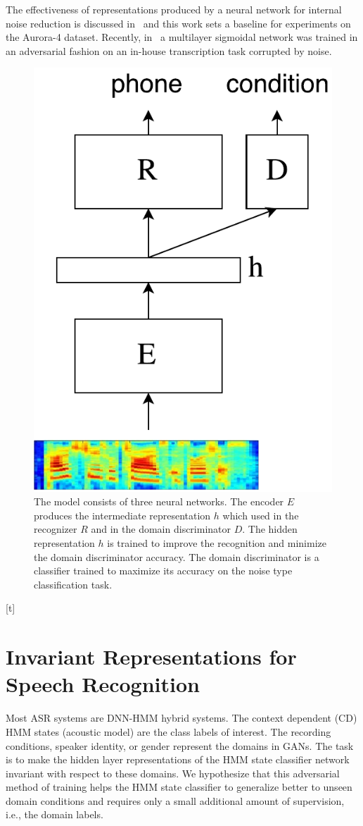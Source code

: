 \documentclass[a4paper]{article}
\begin{document}
    The effectiveness of representations produced by a neural network for internal 
    noise reduction is discussed in~\cite{yu2013feature} and this work sets a 
    baseline for experiments on the Aurora-4 dataset. Recently, 
    in~\cite{yusuke2016adversarial} a multilayer sigmoidal network was trained 
    in an adversarial fashion on an in-house transcription task corrupted by noise.
\begin{figure}[t]
    \centering
    \includegraphics[width=0.4\linewidth]{model.pdf}
    \caption{The model consists of three neural networks. The encoder $E$ produces
    the intermediate representation $h$ which used in the recognizer $R$ and 
    in the domain discriminator $D$. The hidden representation $h$ is trained to improve
    the recognition and minimize the domain discriminator accuracy. The domain discriminator
    is a classifier trained to maximize its accuracy on the noise type
    classification task.}
    \label{fig:model}
\end{figure}[t]

\section{Invariant Representations for Speech Recognition}
\label{sec:invariant-speech}

Most ASR systems are DNN-HMM hybrid systems. The context dependent (CD) HMM 
states (acoustic model) are the class labels of interest. The
recording conditions, speaker identity, or gender represent the domains in 
GANs. The task is to make the hidden layer representations of the HMM state classifier network 
invariant with respect to these domains. We hypothesize that this adversarial method of
training helps the HMM state classifier to generalize better to unseen domain conditions and requires only a  
small additional amount of supervision, i.e., the domain labels.  
\end{document}

